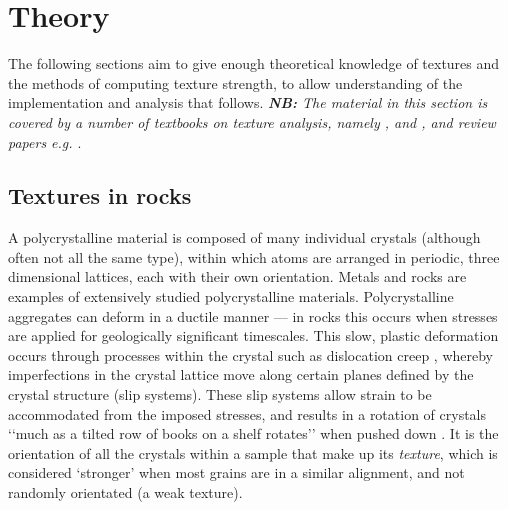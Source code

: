 \documentclass[a4paper,12pt,twoside]{report}
\numberwithin{equation}{chapter}
\begin{document}
\chapter{Theory} \label{chap:theory}
\vspace{-1cm}
The following sections aim to give enough theoretical knowledge of textures and the methods of computing texture strength, to allow understanding of the implementation and analysis that follows. \emph{\textbf{NB:} The material in this section is covered by a number of textbooks on texture analysis, namely \cite{bunge1982texture}, \cite{Bunge1985} and \cite{Randle2000}, and review papers e.g. \cite{Mainprice}}.


\section{Textures in rocks} 
A polycrystalline material is composed of many individual crystals (although often not all the same type), within which atoms are arranged in periodic, three dimensional lattices, each with their own orientation. Metals and rocks are examples of extensively studied polycrystalline materials. Polycrystalline aggregates can deform in a ductile manner --- in rocks this occurs when stresses are applied for geologically significant timescales. This slow, plastic deformation occurs through processes within the crystal such as dislocation creep \citep{Ashby1972},  whereby imperfections in the crystal lattice move along certain planes defined by the crystal structure (slip systems). These slip systems allow strain to be accommodated from the imposed stresses, and results in a rotation of crystals \lq\lq{}much as a tilted row of books on a shelf rotates\rq\rq{} when pushed down \citep{Goulding2015}. It is the orientation of all the crystals within a sample that make up its \emph{texture}, which is considered \lq{}stronger\rq{} when most grains are in a similar alignment, and not randomly orientated (a weak texture).       


\end{document}
